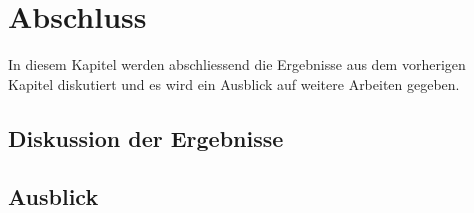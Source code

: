 \chapter{Abschluss}
\label{chapter:conclusion}
In diesem Kapitel werden abschliessend die Ergebnisse aus dem vorherigen Kapitel diskutiert und es wird ein Ausblick auf weitere Arbeiten gegeben.

\section{Diskussion der Ergebnisse}

\section{Ausblick}


